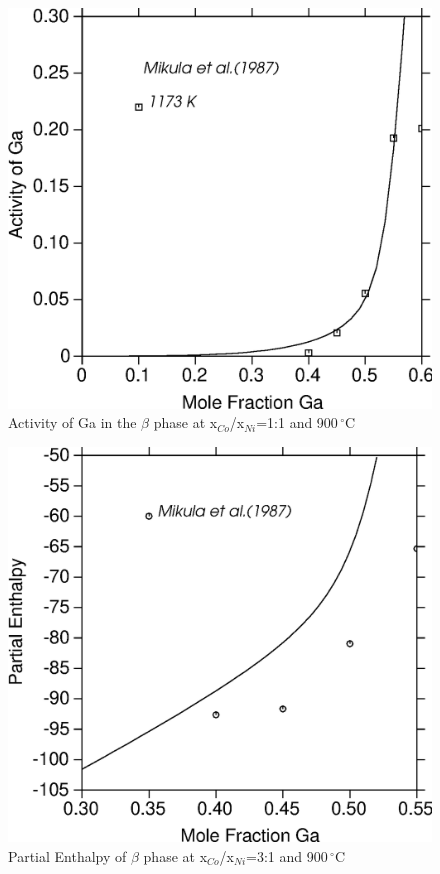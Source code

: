 \documentclass[article]{elsarticle}
\begin{document}
\begin{figure}
\centering
\includegraphics[scale=0.45]{acr_beta_Co50}
\caption{Activity of Ga in the $\beta$ phase at x$_{Co}$/x$_{Ni}$=1:1 and 900$\,^{\circ}\mathrm{C}$}
\label{acr_co50}
\end{figure}
\begin{figure}
\centering
\includegraphics[scale=0.45]{hmr_beta_Co75}
\caption{Partial Enthalpy of $\beta$ phase at x$_{Co}$/x$_{Ni}$=3:1 and 900$\,^{\circ}\mathrm{C}$}
\label{hmr_co75}
\end{figure}
\end{document}
